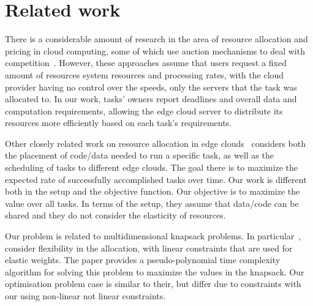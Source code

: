 \section{Related work}\label{sec:related-work}
There is a considerable amount of research in the area of resource allocation and pricing in cloud computing, some of
which use auction mechanisms to deal with competition~\cite{KUMAR2017234,Zhang2017,Du2019,Bi2019}.
However, these approaches assume that users request a fixed amount of resources system resources and processing rates,
with the cloud provider having no control over the speeds, only the servers that the task was allocated to. In our
work, tasks' owners report deadlines and overall data and computation requirements, allowing the edge cloud server to
distribute its resources more efficiently based on each task's requirements.

Other closely related work on resource allocation in edge clouds~\cite{vaji_infocom} considers both the placement of
code/data needed to run a specific task, as well as the scheduling of tasks to different edge clouds. The goal there is
to maximize the expected rate of successfully accomplished tasks over time. Our work is different both in the setup and
the objective function. Our objective is to maximize the value over all tasks. In terms of the setup, they assume that
data/code can be shared and they do not consider the elasticity of resources.

Our problem is related to multidimensional knapsack problems. In particular~\cite{Nip2017}, consider flexibility in
the allocation, with linear constraints that are used for elastic weights. The paper provides a pseudo-polynomial time
complexity algorithm for solving this problem to maximize the values in the knapsack. Our optimisation problem case is
similar to their, but differ due to constraints with our using non-linear not linear constraints.